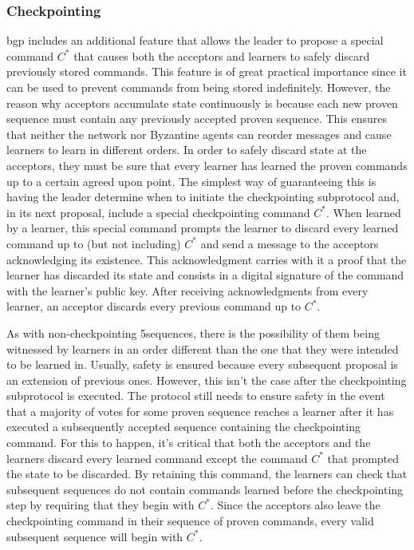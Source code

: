 \subsubsection{Checkpointing}  \acrshort{bgp} includes an additional feature that allows the leader to propose a special command $C^*$ that causes both the acceptors and learners to safely discard previously stored commands. This feature is of great practical importance since it can be used to prevent commands from being stored indefinitely. However, the reason why acceptors accumulate state continuously is because each new proven sequence must contain any previously accepted proven sequence. This ensures that neither the network nor Byzantine agents can reorder messages and cause learners to learn in different orders. In order to safely discard state at the acceptors, they must be sure that every learner has learned the proven commands up to a certain agreed upon point. The simplest way of guaranteeing this is having the leader determine when to initiate the checkpointing subprotocol and, in its next proposal, include a special checkpointing command $C^*$. When learned by a learner, this special command prompts the learner to discard every learned command up to (but not including) $C^*$ and send a message to the acceptors acknowledging its existence. This acknowledgment carries with it a proof that the learner has discarded its state and consists in a digital signature of the command with the learner's public key. After receiving acknowledgments from every learner, an acceptor discards every previous command up to $C^*$. \par
As with non-checkpointing 5sequences, there is the possibility of them being witnessed by learners in an order different than the one that they were intended to be learned in. Usually, safety is ensured because every subsequent proposal is an extension of previous ones. However, this isn't the case after the checkpointing subprotocol is executed. The protocol still needs to ensure safety in the event that a majority of votes for some proven sequence reaches a learner after it has executed a subsequently accepted sequence containing the checkpointing command. For this to happen, it's critical that both the acceptors and the learners discard every learned command except the command $C^*$ that prompted the state to be discarded. By retaining this command, the learners can check that subsequent sequences do not contain commands learned before the checkpointing step by requiring that they begin with $C^*$. Since the acceptors also leave the checkpointing command in their sequence of proven commands, every valid subsequent sequence will begin with $C^*$.


